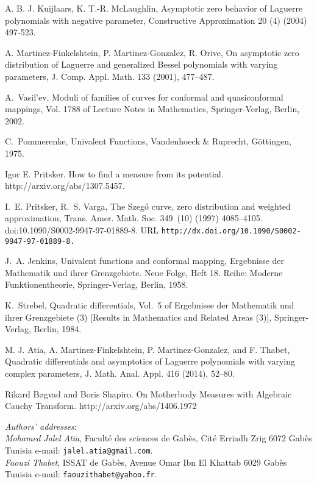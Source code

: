 \documentclass[12pt]{amsart}
\begin{document}
\begin{thebibliography}{99}

 A. B. J. Kuijlaars, K. T.-R. McLaughlin, Asymptotic zero
behavior of Laguerre polynomials with negative parameter, Constructive
Approximation 20 (4) (2004) 497-523.

 A. Martinez-Finkelshtein, P. Martinez-Gonzalez, R. Orive, On
asymptotic zero distribution of Laguerre and generalized Bessel polynomials
with varying parameters, J. Comp. Appl. Math. 133 (2001), 477--487.

 A.~Vasil{'}ev, Moduli of families of curves for
conformal and quasiconformal mappings, Vol. 1788 of Lecture Notes in
Mathematics, Springer-Verlag, Berlin, 2002.



 C.~Pommerenke, Univalent Functions, Vandenhoeck \&
Ruprecht, G\"{o}ttingen, 1975.


 Igor E. Pritsker. How to find a measure from its
potential. http://arxiv.org/abs/1307.5457.

 I.~E. Pritsker, R.~S. Varga, The {S}zeg{\H{o}} curve,
zero distribution and weighted approximation, Trans. Amer. Math. Soc.
349~(10) (1997) 4085--4105. \newblock doi:10.1090/S0002-9947-97-01889-8. URL 
\texttt{http://dx.doi.org/10.1090/S0002-9947-97-01889-8.}

 J.~A. Jenkins, Univalent functions and conformal
mapping, Ergebnisse der Mathematik und ihrer Grenzgebiete. Neue Folge, Heft
18. Reihe: Moderne Funktionentheorie, Springer-Verlag, Berlin, 1958.

 K.~Strebel, Quadratic differentials, Vol.~5 of
Ergebnisse der Mathematik und ihrer Grenzgebiete (3) [Results in Mathematics
and Related Areas (3)], Springer-Verlag, Berlin, 1984.

 M. J. Atia, A. Martinez-Finkelshtein, P. Martinez-Gonzalez,
and F. Thabet, Quadratic differentials and asymptotics of Laguerre
polynomials with varying complex parameters, J. Math. Anal. Appl. 416
(2014), 52--80.

 Rikard B\o gvad and Boris Shapiro. On Motherbody Measures
with Algebraic Cauchy Transform. http://arxiv.org/abs/1406.1972








\end{thebibliography}
{\small
{\em Authors' addresses}:
\\{\em Mohamed Jalel Atia}, Facult\'e des sciences de Gab\`{e}s, Cit\'e Erriadh Zrig 6072 Gab\`{e}s Tunisia
 e-mail: \texttt{jalel.atia@\allowbreak gmail.com}.
\\{\em Faouzi Thabet}, ISSAT de Gab\`{e}s, Avenue Omar Ibn El Khattab 6029 Gab\`{e}s  Tunisia
 e-mail: \texttt{faouzithabet@\allowbreak yahoo.fr}.
}
\end{document}
